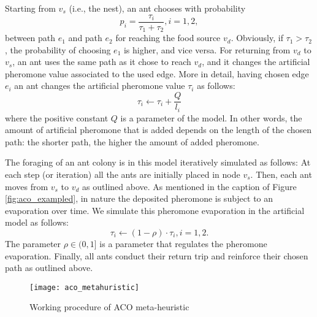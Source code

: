 Starting from $v_s$ (i.e., the nest), an ant chooses with probability
\begin{equation}
\label{eq:probability1}
 p_i = \frac{{\tau}_i}{{\tau}_1 + {\tau}_2}, i = 1, 2,
 \end{equation}
between path $e_1$ and path $e_2$ for reaching the food source $v_d$. Obviously, if ${\tau}_1 > {\tau}_2$, the probability of choosing $e_1$ is higher, and vice versa. For returning from $v_d$ to $v_s$, an ant uses the same path as it chose to reach $v_d$, and it changes the artificial pheromone value associated to the used edge. More in detail, having chosen edge $e_i$ an ant changes the artificial pheromone value ${\tau}_i$ as follows:
\begin{equation}
\label{eq:pheromone1}
{\tau}_i \leftarrow {\tau}_i + \frac{Q}{l_i}
\end{equation}
where the positive constant $Q$ is a parameter of the model. In other words, the amount of artificial pheromone that is added depends on the length of the chosen path: the shorter path, the higher the amount of added pheromone.

The foraging of an ant colony is in this model iteratively simulated as follows: At each step (or iteration) all the ants are initially placed in node $v_s$. Then, each ant moves from $v_s$ to $v_d$ as outlined above. As mentioned in the caption of Figure \ref{fig:aco_exampled}, in nature the deposited pheromone is subject to an evaporation over time. We simulate this pheromone evaporation in the artificial model as follows:
\begin{equation}
\label{eq:pheromone2}
{\tau}_i \leftarrow (1-\rho) \cdot {\tau}_i, i = 1, 2.
\end{equation}
The parameter $\rho \in (0,1]$ is a parameter that regulates the pheromone evaporation. Finally, all ants conduct their return trip and reinforce their chosen path as outlined above.
\begin{figure}
\centering
\texttt{[image: aco\_metahuristic]}
\caption {Working procedure of ACO meta-heuristic}
\label {fig:aco_metahuristic}
\end{figure}

